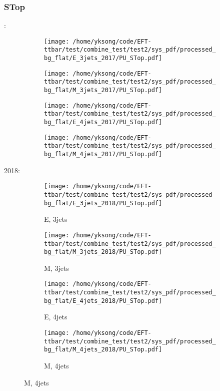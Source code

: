 \documentclass{beamer}
\begin{document}
\begin{frame}
\frametitle{STop}
\fontsize{5}{1}:
\begin{figure}
\centering
\begin{subfigure}[b]{0.24\textwidth}
\texttt{[image: /home/yksong/code/EFT-ttbar/test/combine\_test/test2/sys\_pdf/processed\_bg\_flat/E\_3jets\_2017/PU\_STop.pdf]}
\end{subfigure}
\begin{subfigure}[b]{0.24\textwidth}
\texttt{[image: /home/yksong/code/EFT-ttbar/test/combine\_test/test2/sys\_pdf/processed\_bg\_flat/M\_3jets\_2017/PU\_STop.pdf]}
\end{subfigure}
\begin{subfigure}[b]{0.24\textwidth}
\texttt{[image: /home/yksong/code/EFT-ttbar/test/combine\_test/test2/sys\_pdf/processed\_bg\_flat/E\_4jets\_2017/PU\_STop.pdf]}
\end{subfigure}
\begin{subfigure}[b]{0.24\textwidth}
\texttt{[image: /home/yksong/code/EFT-ttbar/test/combine\_test/test2/sys\_pdf/processed\_bg\_flat/M\_4jets\_2017/PU\_STop.pdf]}
\end{subfigure}
\end{figure}
2018:
\begin{figure}
\centering
\begin{subfigure}[b]{0.24\textwidth}
\texttt{[image: /home/yksong/code/EFT-ttbar/test/combine\_test/test2/sys\_pdf/processed\_bg\_flat/E\_3jets\_2018/PU\_STop.pdf]}
\captionsetup{font=tiny}
\caption{E, 3jets}
\end{subfigure}
\begin{subfigure}[b]{0.24\textwidth}
\texttt{[image: /home/yksong/code/EFT-ttbar/test/combine\_test/test2/sys\_pdf/processed\_bg\_flat/M\_3jets\_2018/PU\_STop.pdf]}
\captionsetup{font=tiny}
\caption{M, 3jets}
\end{subfigure}
\begin{subfigure}[b]{0.24\textwidth}
\texttt{[image: /home/yksong/code/EFT-ttbar/test/combine\_test/test2/sys\_pdf/processed\_bg\_flat/E\_4jets\_2018/PU\_STop.pdf]}
\captionsetup{font=tiny}
\caption{E, 4jets}
\end{subfigure}
\begin{subfigure}[b]{0.24\textwidth}
\texttt{[image: /home/yksong/code/EFT-ttbar/test/combine\_test/test2/sys\_pdf/processed\_bg\_flat/M\_4jets\_2018/PU\_STop.pdf]}
\captionsetup{font=tiny}
\caption{M, 4jets}
\end{subfigure}
\end{figure}
\end{frame}
\end{document}
